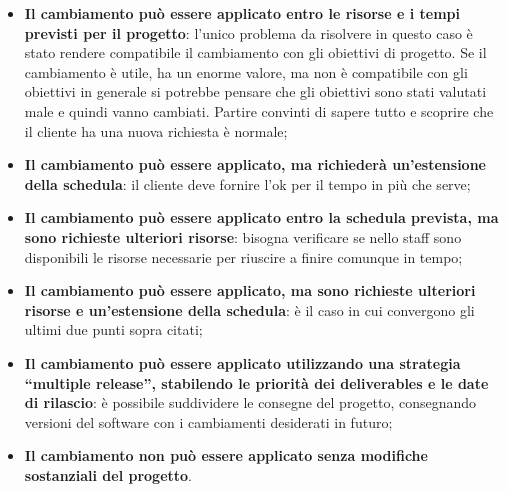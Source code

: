 \begin{itemize}
	\item \textbf{Il cambiamento può essere applicato entro le risorse e i tempi previsti per il progetto}: l'unico problema da risolvere in questo caso è stato rendere compatibile il cambiamento con gli obiettivi di progetto. Se il cambiamento è utile, ha un enorme valore, ma non è compatibile con gli obiettivi in generale si potrebbe pensare che gli obiettivi sono stati valutati male e quindi vanno cambiati. Partire convinti di sapere tutto e scoprire che il cliente ha una nuova richiesta è normale;
	\item \textbf{Il cambiamento può essere applicato, ma richiederà un’estensione della schedula}: il cliente deve fornire l'ok per il tempo in più che serve;
	\item \textbf{Il cambiamento può essere applicato entro la schedula prevista, ma sono richieste ulteriori risorse}: bisogna verificare se nello staff sono disponibili le risorse necessarie per riuscire a finire comunque in tempo;
	\item \textbf{Il cambiamento può essere applicato, ma sono richieste ulteriori risorse e un’estensione della schedula}: è il caso in cui convergono gli ultimi due punti sopra citati;
	\item \textbf{Il cambiamento può essere applicato utilizzando una strategia “multiple release”, stabilendo le priorità dei deliverables e le date di rilascio}: è possibile suddividere le consegne del progetto, consegnando versioni del software con i cambiamenti desiderati in futuro;
	\item \textbf{Il cambiamento non può essere applicato senza modifiche sostanziali del progetto}.
\end{itemize}

